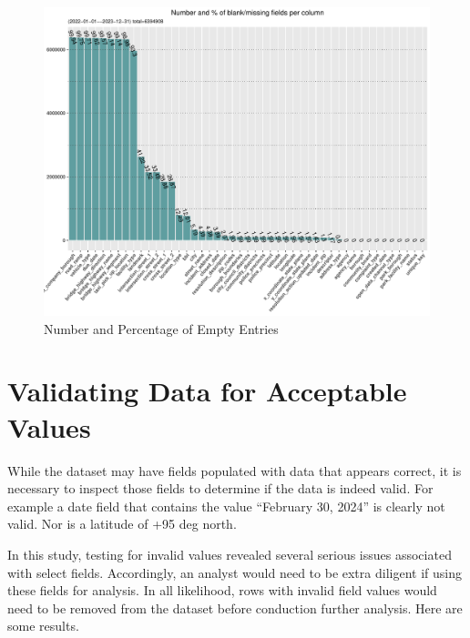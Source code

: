\documentclass[12pt, titlepage]{article}
\begin{document}
\begin{figure}[H]
  \centering
	  \includegraphics[width=\textwidth]{BlankFields.pdf}
	  \caption{Number and Percentage of Empty Entries}
	  \label{fig:blank_fields}
\end{figure}



 \section{Validating Data for Acceptable Values}\label{sec:domain}
 While the dataset may have fields populated with data that appears correct, it is necessary to inspect those fields to determine if the data is indeed valid. 
 For example a date field that contains the value ``February 30, 2024'' is clearly not valid. Nor is a latitude of +95 deg north. 
 
 In this study, testing for invalid values revealed several serious issues associated with select fields. Accordingly, an analyst would need to be
extra diligent if using these fields for analysis. In all likelihood, rows with invalid field values would  need to be removed from the
dataset before conduction further analysis. Here are some results.
\end{document}
